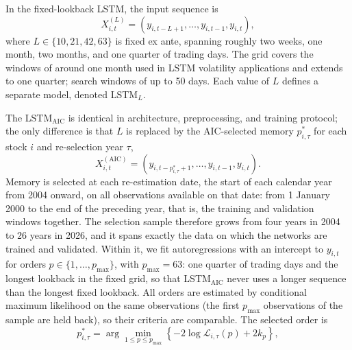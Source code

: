 \documentclass[12pt]{article}
\begin{document}
\noindent In the fixed-lookback LSTM, the input sequence is
\begin{equation}
X_{i,t}^{(L)}
=
\left(
y_{i,t-L+1},
\dots,
y_{i,t-1},
y_{i,t}
\right),
\end{equation}
\noindent where $L \in \{10, 21, 42, 63\}$ is fixed ex ante, spanning roughly two weeks, one month, two months, and one quarter of trading days. The grid covers the windows of around one month used in LSTM volatility applications \parencite{zhang-2023,rosenbaum-2022} and extends to one quarter; \textcite{rodikov-2022} search windows of up to 50 days. Each value of $L$ defines a separate model, denoted LSTM$_{L}$.

The LSTM$_{\mathrm{AIC}}$ is identical in architecture, preprocessing, and training protocol; the only difference is that $L$ is replaced by the AIC-selected memory $p_{i,\tau}^{*}$ for each stock $i$ and re-selection year $\tau$,
\begin{equation}
X_{i,t}^{(\mathrm{AIC})}
=
\left(
y_{i,t-p_{i,\tau}^{*}+1},
\dots,
y_{i,t-1},
y_{i,t}
\right).
\end{equation}
\noindent Memory is selected at each re-estimation date, the start of each calendar year from 2004 onward, on all observations available on that date: from 1 January 2000 to the end of the preceding year, that is, the training and validation windows together. The selection sample therefore grows from four years in 2004 to 26 years in 2026, and it spans exactly the data on which the networks are trained and validated. Within it, we fit autoregressions with an intercept to $y_{i,t}$ for orders $p \in \{1,\dots,p_{\max}\}$, with $p_{\max}=63$: one quarter of trading days and the longest lookback in the fixed grid, so that LSTM$_{\mathrm{AIC}}$ never uses a longer sequence than the longest fixed lookback. All orders are estimated by conditional maximum likelihood on the same observations (the first $p_{\max}$ observations of the sample are held back), so their criteria are comparable. The selected order is
\begin{equation}
p_{i,\tau}^{*}
=
\arg\min_{1 \le p \le p_{\max}}
\left\{
-2\log \mathcal{L}_{i,\tau}(p)+2k_p
\right\},
\end{equation}
\end{document}

